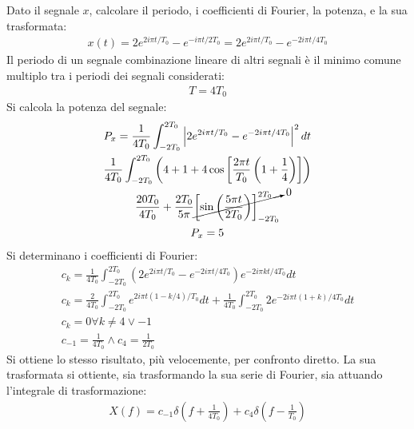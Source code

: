 \documentclass{article}
\numberwithin{equation}{subsection}
\begin{document}
Dato il segnale $x$, calcolare il periodo, i coefficienti di Fourier, la potenza, e la sua trasformata:
\begin{gather*}
    x(t)=2e^{2i\pi t/T_0}-e^{-i\pi t/2T_0}=2e^{2i\pi t/T_0}-e^{-2i\pi t/4T_0}
\end{gather*}
Il periodo di un segnale combinazione lineare di altri segnali è il minimo comune multiplo tra i periodi dei segnali considerati:
\begin{gather*}
    T=4T_0
\end{gather*}
Si calcola la potenza del segnale:
\begin{gather*}
    P_x=\displaystyle\frac{1}{4T_0}\int_{-2T_0}^{2T_0}\left|2e^{2i\pi t/T_0}-e^{-2i\pi t/4T_0}\right|^2dt\\
    \displaystyle\frac{1}{4T_0}\int_{-2T_0}^{2T_0}\left(4+1+4\cos\left[\frac{2\pi t}{T_0}\left(1+\frac{1}{4}\right)\right]\right)\\
    \displaystyle\frac{20T_0}{4T_0}+\frac{2T_0}{5\pi }\cancelto{0}{\left[\sin\left(\frac{5\pi t}{2T_0}\right)\right]_{-2T_0}^{2T_0}}\\
    P_x=5
\end{gather*}
Si determinano i coefficienti di Fourier:
\begin{gather*}
    c_k=\displaystyle\frac{1}{4T_0}\int_{-2T_0}^{2T_0}\left(2e^{2i\pi t/T_0}-e^{-2i\pi t/4T_0}\right)e^{-2i\pi kt/4T_0}dt\\
    c_k=\displaystyle\frac{2}{4T_0}\int_{-2T_0}^{2T_0}e^{2i\pi t(1-k/4)/T_0}dt+\frac{1}{4T_0}\int_{-2T_0}^{2T_0}2e^{-2i\pi t(1+k)/4T_0}dt\\
    c_k=0\forall k\neq4\lor-1\\
    c_{-1}=\displaystyle\frac{1}{4T_0}\land c_4=\frac{1}{2T_0}
\end{gather*}
Si ottiene lo stesso risultato, più velocemente, per confronto diretto. La sua trasformata si ottiente, sia trasformando la sua serie di Fourier, sia attuando l'integrale 
di trasformazione:
\begin{gather*}
    X(f)=c_{-1}\delta\left(f+\displaystyle\frac{1}{4T_0}\right)+c_{4}\delta\left(f-\displaystyle\frac{1}{T_0}\right)
\end{gather*}
\end{document}
